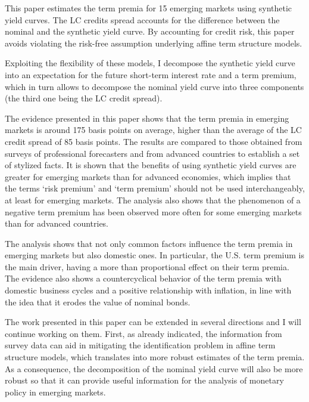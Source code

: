 This paper estimates the term premia for 15 emerging markets using synthetic yield curves. The LC credits spread accounts for the difference between the nominal and the synthetic yield curve. By accounting for credit risk, this paper avoids violating the risk-free assumption underlying affine term structure models.

Exploiting the flexibility of these models, I decompose the synthetic yield curve into an expectation for the future short-term interest rate and a term premium, which in turn allows to decompose the nominal yield curve into three components (the third one being the LC credit spread).

The evidence presented in this paper shows that the term premia in emerging markets is around 175 basis points on average, higher than the average of the LC credit spread of 85 basis points. The results are compared to those obtained from surveys of professional forecasters and from advanced countries to establish a set of stylized facts. It is shown that the benefits of using synthetic yield curves are greater for emerging markets than for advanced economies, which implies that the terms `risk premium' and `term premium' should not be used interchangeably, at least for emerging markets. The analysis also shows that the phenomenon of a negative term premium has been observed more often for some emerging markets than for advanced countries.

The analysis shows that not only common factors influence the term premia in emerging markets but also domestic ones. In particular, the U.S. term premium is the main driver, having a more than proportional effect on their term premia. The evidence also shows a countercyclical behavior of the term premia with domestic business cycles and a positive relationship with inflation, in line with the idea that it erodes the value of nominal bonds.

The work presented in this paper can be extended in several directions and I will continue working on them. First, as already indicated, the information from survey data can aid in mitigating the identification problem in affine term structure models, which translates into more robust estimates of the term premia. As a consequence, the decomposition of the nominal yield curve will also be more robust so that it can provide useful information for the analysis of monetary policy in emerging markets.

